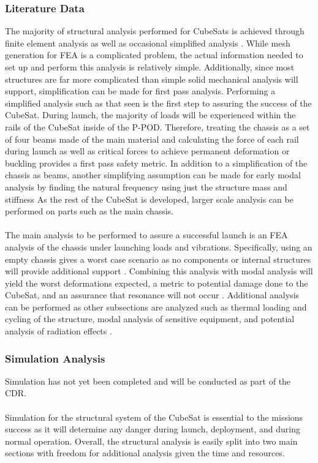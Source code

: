 \subsubsection{Literature Data}
The majority of structural analysis performed for CubeSats is achieved through finite element analysis \cite{FEA1, FEA3, FEA4, FEA5} as well as occasional simplified analysis \cite{FEA2}. While mesh generation for FEA is a complicated problem, the actual information needed to set up and perform this analysis is relatively simple. Additionally, since most structures are far more complicated than simple solid mechanical analysis will support, simplification can be made for first pass analysis. Performing a simplified analysis such as that seen \cite{FEA2} is the first step to assuring the success of the CubeSat. During launch, the majority of loads will be experienced within the rails of the CubeSat inside of the P-POD. Therefore, treating the chassis as a set of four beams made of the main material and calculating the force of each rail during launch as well as critical forces to achieve permanent deformation or buckling provides a first pass safety metric. In addition to a simplification of the chassis as beams, another simplifying assumption can be made for early modal analysis by finding the natural frequency using just the structure mass and stiffness \cite{FEA5} As the rest of the CubeSat is developed, larger scale analysis can be performed on parts such as the main chassis.
\\
\\
The main analysis to be performed to assure a successful launch is an FEA analysis of the chassis under launching loads and vibrations. Specifically, using an empty chassis gives a worst case scenario as no components or internal structures will provide additional support \cite{FEA5}. Combining this analysis with modal analysis will yield the worst deformations expected, a metric to potential damage done to the CubeSat, and an assurance that resonance will not occur \cite{FEA1, FEA5}. Additional analysis can be performed as other subsections are analyzed such as thermal loading and cycling of the structure, modal analysis of sensitive equipment, and potential analysis of radiation effects \cite{FEA5, FEA6, FEA7, SCRP}.
\subsubsection{Simulation Analysis}
Simulation has not yet been completed and will be conducted as part of the CDR.
\\
\\
Simulation for the structural system of the CubeSat is essential to the missions success as it will determine any danger during launch, deployment, and during normal operation. Overall, the structural analysis is easily split into two main sections with freedom for additional analysis given the time and resources.
